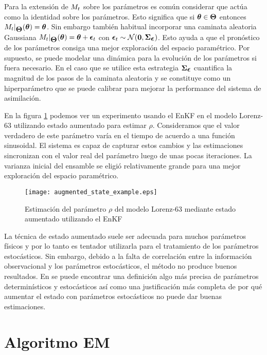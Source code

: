 Para la extensión de $\mathbf{\mathcal}{M}_t$ sobre los parámetros es común considerar que actúa como la identidad sobre los parámetros. Esto significa que si $\mbox{\boldmath$ \theta $} \in \mbox{\boldmath$ \Theta $}$ entonces $\mathbf{\mathcal}{M}_t |_{\mbox{\boldmath$ \Theta $}} (\mbox{\boldmath$ \theta $}) = \mbox{\boldmath$ \theta $}$. Sin embargo también habitual incorporar una caminata aleatoria Gaussiana $\mathbf{\mathcal}{M}_t |_{\mbox{\boldmath$ \Theta $}} (\mbox{\boldmath$ \theta $}) = \mbox{\boldmath$ \theta $} + \mbox{\boldmath$ \epsilon $}_t$ con $\mbox{\boldmath$ \epsilon $}_t \sim \mathcal{N}(\mathbf{0}, \mbox{\boldmath$ \Sigma $}_{\mbox{\boldmath$ \epsilon $}})$. Esto ayuda a que el pronóstico de los parámetros consiga una mejor exploración del espacio paramétrico. Por supuesto, se puede modelar una dinámica para la evolución de los parámetros si fuera necesario. En el caso que se utilice esta estrategia $\mbox{\boldmath$ \Sigma $}_{\mbox{\boldmath$ \epsilon $}}$ cuantifica la magnitud de los pasos de la caminata aleatoria y se constituye como un hiperparámetro que se puede calibrar para mejorar la performance del sistema de asimilación. 

En la figura \ref{fig:augmented_state_example} podemos ver un experimento usando el EnKF en el modelo Lorenz-63 utilizando estado aumentado para estimar $\rho$. Consideramos que el valor verdadero de este parámetro varía en el tiempo de acuerdo a una función sinusoidal. El sistema es capaz de capturar estos cambios y las estimaciones sincronizan con el valor real del parámetro luego de unas pocas iteraciones. La varianza inicial del ensamble se eligió relativamente grande para una mejor exploración del espacio paramétrico.

\begin{figure}[h]
    \centering
    \texttt{[image: augmented\_state\_example.eps]}
    \caption{Estimación del parámetro $\rho$ del modelo Lorenz-63 mediante estado aumentado utilizando el EnKF}
    \label{fig:augmented_state_example}
\end{figure}

La técnica de estado aumentado suele ser adecuada para muchos parámetros físicos y por lo tanto es tentador utilizarla para el tratamiento de los parámetros estocásticos. Sin embargo, debido a la falta de correlación entre la información observacional y los parámetros estocásticos, el método no produce buenos resultados. En \cite{Delsole2010} se puede encontrar una definición algo más precisa de parámetros determinísticos y estocásticos así como una justificación más completa de por qué aumentar el estado con parámetros estocásticos no puede dar buenas estimaciones.

\section{Algoritmo EM}

